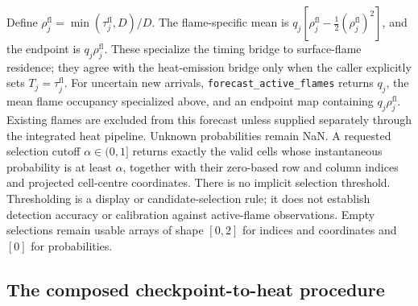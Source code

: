 \documentclass[11pt,a4paper]{article}
\begin{document}
Define $\rho_j^{\mathrm{fl}}=\min(\tau_j^{\mathrm{fl}},D)/D$. The
flame-specific mean is $q_j[\rho_j^{\mathrm{fl}}-\tfrac12(\rho_j^{\mathrm{fl}})^2]$,
and the endpoint is $q_j\rho_j^{\mathrm{fl}}$. These specialize the timing
bridge to surface-flame residence; they agree with the heat-emission bridge
only when the caller explicitly sets $T_j=\tau_j^{\mathrm{fl}}$.
For uncertain new arrivals, \texttt{forecast\_active\_flames} returns
$q_j$, the mean flame occupancy specialized above, and an
endpoint map containing $q_j\rho_j^{\mathrm{fl}}$. Existing flames are excluded from
this forecast unless supplied separately through the integrated heat
pipeline. Unknown probabilities remain NaN. A requested selection cutoff
$\alpha\in(0,1]$ returns exactly the valid cells whose instantaneous
probability is at least $\alpha$, together with their zero-based row and
column indices and projected cell-centre coordinates. There is no implicit
selection threshold. Thresholding is a display or candidate-selection rule;
it does not establish detection accuracy or calibration against active-flame
observations. Empty selections remain usable arrays of shape $[0,2]$ for
indices and coordinates and $[0]$ for probabilities.

\subsection{The composed checkpoint-to-heat procedure}
\label{sec:heat-pipeline}
\end{document}
